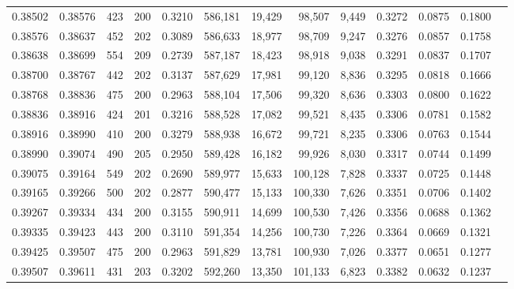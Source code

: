 \begin{tabular}{rrrrrrrrrrrrr}
0.38502 & 0.38576 &   423 & 200 &                                     0.3210 & 586,181 &  19,429 &  98,507 &   9,449 & 0.3272 & 0.0875 & 0.1800 \\
0.38576 & 0.38637 &   452 & 202 &                                     0.3089 & 586,633 &  18,977 &  98,709 &   9,247 & 0.3276 & 0.0857 & 0.1758 \\
0.38638 & 0.38699 &   554 & 209 &                                     0.2739 & 587,187 &  18,423 &  98,918 &   9,038 & 0.3291 & 0.0837 & 0.1707 \\
0.38700 & 0.38767 &   442 & 202 &                                     0.3137 & 587,629 &  17,981 &  99,120 &   8,836 & 0.3295 & 0.0818 & 0.1666 \\
0.38768 & 0.38836 &   475 & 200 &                                     0.2963 & 588,104 &  17,506 &  99,320 &   8,636 & 0.3303 & 0.0800 & 0.1622 \\
0.38836 & 0.38916 &   424 & 201 &                                     0.3216 & 588,528 &  17,082 &  99,521 &   8,435 & 0.3306 & 0.0781 & 0.1582 \\
0.38916 & 0.38990 &   410 & 200 &                                     0.3279 & 588,938 &  16,672 &  99,721 &   8,235 & 0.3306 & 0.0763 & 0.1544 \\
0.38990 & 0.39074 &   490 & 205 &                                     0.2950 & 589,428 &  16,182 &  99,926 &   8,030 & 0.3317 & 0.0744 & 0.1499 \\
0.39075 & 0.39164 &   549 & 202 &                                     0.2690 & 589,977 &  15,633 & 100,128 &   7,828 & 0.3337 & 0.0725 & 0.1448 \\
0.39165 & 0.39266 &   500 & 202 &                                     0.2877 & 590,477 &  15,133 & 100,330 &   7,626 & 0.3351 & 0.0706 & 0.1402 \\
0.39267 & 0.39334 &   434 & 200 &                                     0.3155 & 590,911 &  14,699 & 100,530 &   7,426 & 0.3356 & 0.0688 & 0.1362 \\
0.39335 & 0.39423 &   443 & 200 &                                     0.3110 & 591,354 &  14,256 & 100,730 &   7,226 & 0.3364 & 0.0669 & 0.1321 \\
0.39425 & 0.39507 &   475 & 200 &                                     0.2963 & 591,829 &  13,781 & 100,930 &   7,026 & 0.3377 & 0.0651 & 0.1277 \\
0.39507 & 0.39611 &   431 & 203 &                                     0.3202 & 592,260 &  13,350 & 101,133 &   6,823 & 0.3382 & 0.0632 & 0.1237 \\

\end{tabular}
